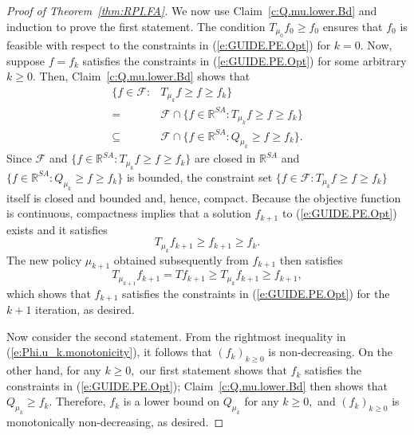 \documentclass[twoside]{article}
\theoremstyle{plain}
\theoremstyle{definition}
\theoremstyle{remark}
\newcommand{\bR}{\mathbb{R}}
\newcommand{\cF}{\mathcal{F}}
\renewcommand{\eqref}[1]{(\ref{#1})}
\begin{document}
\begin{proof}[Proof of Theorem~\ref{thm:RPI.FA}]
%
We now use Claim~\ref{c:Q.mu.lower.Bd} and induction to prove the first statement. The condition  $T_{\mu_0} f_0 \geq f_0$ ensures that $f_0$ is feasible with respect to the constraints in \eqref{e:GUIDE.PE.Opt} for $k = 0$. Now, suppose $f = f_k$ satisfies the constraints in \eqref{e:GUIDE.PE.Opt} for some arbitrary $k \geq 0.$ Then, Claim~\ref{c:Q.mu.lower.Bd} shows that
%
\begin{equation}
\label{e:constraint.implies.Qmu.upper.Bd}
\begin{aligned}
    \{f \in \cF: & T_{\mu_k} f \geq f \geq f_k\} \\
    = {} & \cF \cap \{f \in \bR^{SA}: T_{\mu_k} f \geq f \geq f_k\} \\
    \subseteq {} & \cF \cap \{f \in \bR^{SA}: Q_{\mu_k} \geq f \geq f_k\}.
\end{aligned}
\end{equation}
%
Since $\cF$ and $\{f \in \bR^{SA}: T_{\mu_k} f \geq f \geq f_k\}$ are closed in $\bR^{SA}$ and $\{f \in \bR^{SA}: Q_{\mu_k} \geq f \geq f_k\}$ is bounded, the constraint set $\{f \in \cF: T_{\mu_k} f \geq f \geq f_k\}$ itself is closed and bounded and, hence, compact. Because the objective function is continuous,  compactness implies that a solution $f_{k + 1}$ to \eqref{e:GUIDE.PE.Opt} exists and it satisfies
%
\begin{equation}
\label{e:Phi.u_k.monotonicity}
    T_{\mu_k} f_{k + 1} \geq f_{k + 1} \geq f_k.
\end{equation}
%
The new policy $\mu_{k + 1}$ obtained subsequently from $f_{k + 1}$ then satisfies
%
\begin{equation}
\label{e:RPI.induction.constraint.feasibility}
    T_{\mu_{k + 1}} f_{k + 1} = T f_{k + 1} \geq T_{\mu_k} f_{k + 1} \geq f_{k + 1},
\end{equation}
%
which shows that $f_{k + 1}$ satisfies the constraints in \eqref{e:GUIDE.PE.Opt} for the $k + 1$ iteration, as desired. 

Now consider the second statement. From the rightmost inequality in \eqref{e:Phi.u_k.monotonicity}, it follows that $(f_k)_{k \geq 0}$ is non-decreasing. On the other hand, for any $k \geq 0,$ our first statement shows that $f_k$ satisfies the constraints in \eqref{e:GUIDE.PE.Opt}; Claim~\ref{c:Q.mu.lower.Bd} then shows that $Q_{\mu_k} \geq f_k.$ Therefore, $f_k$ is a lower bound on $Q_{\mu_k}$ for any $k \geq 0,$ and $(f_k)_{k \geq 0}$ is monotonically non-decreasing, as desired. 


\end{proof}
\end{document}
